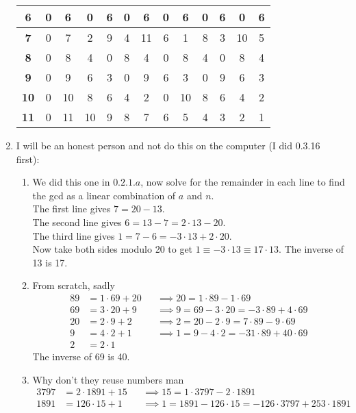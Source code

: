 \documentclass[]{article}
\begin{document}
\begin{enumerate}
\begin{center}
\begin{tabular}{c||c|c|c|c|c|c|c|c|c|c|c|c|}
\textbf{6} & 0 & 6 & 0 & 6 & 0 & 6 & 0 & 6 & 0 & 6 & 0 & 6 \\ \hline
\textbf{7} & 0 & 7 & 2 & 9 & 4 & 11 & 6 & {\color{red} 1} & 8 & 3 & 10 & 5 \\ \hline
\textbf{8} & 0 & 8 & 4 & 0 & 8 & 4 & 0 & 8 & 4 & 0 & 8 & 4 \\ \hline
\textbf{9} & 0 & 9 & 6 & 3 & 0 & 9 & 6 & 3 & 0 & 9 & 6 & 3 \\ \hline
\textbf{10} & 0 & 10 & 8 & 6 & 4 & 2 & 0 & 10 & 8 & 6 & 4 & 2 \\ \hline
\textbf{11} & 0 & 11 & 10 & 9 & 8 & 7 & 6 & 5 & 4 & 3 & 2 & {\color{red} 1}\\ \hline
\end{tabular}
\end{center}
\item I will be an honest person and not do this on the computer (I did 0.3.16 first):
\begin{enumerate}
\item We did this one in $0.2.1.a$, now solve for the remainder in each line to find the gcd as a linear combination of $a$ and $n$. \\
The first line gives $7 = 20 - 13$. \\
The second line gives $6 = 13 - 7 = 2\cdot 13 - 20$. \\
The third line gives $1 = 7 - 6 = -3\cdot 13 + 2\cdot 20$. \\
Now take both sides modulo 20 to get $1 \equiv -3\cdot 13 \equiv 17\cdot 13$. The inverse of 13 is 17.
\item From scratch, sadly
\begin{align}
89 &= 1\cdot 69 + 20 &&\implies 20 = 1\cdot 89 - 1\cdot 69 \\
69 &= 3\cdot 20 + 9 &&\implies 9 = 69 - 3\cdot 20 = -3\cdot 89 + 4\cdot 69 \\
20 &= 2\cdot 9 + 2 &&\implies 2 = 20 - 2\cdot 9 = 7\cdot 89 - 9\cdot 69 \\
9 &= 4\cdot 2 + 1 &&\implies 1 = 9 - 4\cdot 2 = -31\cdot 89 + 40\cdot 69 \\
2 &= 2\cdot 1
\end{align}
The inverse of 69 is 40.
\item Why don't they reuse numbers man
\begin{align}
3797 &= 2\cdot 1891 + 15 &&\implies 15 = 1\cdot 3797 - 2\cdot 1891 \\
1891 &= 126\cdot 15 + 1 &&\implies 1 = 1891 - 126\cdot 15 = -126\cdot 3797 + 253\cdot 1891 \\

\end{align}
\end{enumerate}
\end{enumerate}
\end{document}
